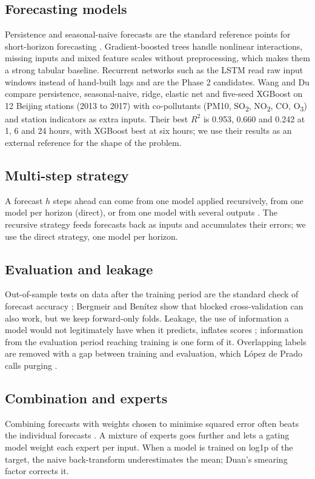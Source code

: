 \documentclass[conference]{IEEEtran}
\begin{document}
\subsection{Forecasting models}
Persistence and seasonal-naive forecasts are the standard reference points for short-horizon forecasting \cite{hyndman2021}. Gradient-boosted trees \cite{chen2016} handle nonlinear interactions, missing inputs and mixed feature scales without preprocessing, which makes them a strong tabular baseline. Recurrent networks such as the LSTM \cite{hochreiter1997} read raw input windows instead of hand-built lags and are the Phase 2 candidates. Wang and Du \cite{wang2026} compare persistence, seasonal-naive, ridge, elastic net and five-seed XGBoost on 12 Beijing stations (2013 to 2017) with co-pollutants (PM10, SO\textsubscript{2}, NO\textsubscript{2}, CO, O\textsubscript{3}) and station indicators as extra inputs. Their best $R^2$ is 0.953, 0.660 and 0.242 at 1, 6 and 24 hours, with XGBoost best at six hours; we use their results as an external reference for the shape of the problem.

\subsection{Multi-step strategy}
A forecast $h$ steps ahead can come from one model applied recursively, from one model per horizon (direct), or from one model with several outputs \cite{bentaieb2012}. The recursive strategy feeds forecasts back as inputs and accumulates their errors; we use the direct strategy, one model per horizon.

\subsection{Evaluation and leakage}
Out-of-sample tests on data after the training period are the standard check of forecast accuracy \cite{tashman2000}; Bergmeir and Ben\'{i}tez \cite{bergmeir2012} show that blocked cross-validation can also work, but we keep forward-only folds. Leakage, the use of information a model would not legitimately have when it predicts, inflates scores \cite{kaufman2012}; information from the evaluation period reaching training is one form of it. Overlapping labels are removed with a gap between training and evaluation, which L\'{o}pez de Prado calls purging \cite{lopezdeprado2018}.

\subsection{Combination and experts}
Combining forecasts with weights chosen to minimise squared error often beats the individual forecasts \cite{bates1969}. A mixture of experts \cite{jacobs1991} goes further and lets a gating model weight each expert per input. When a model is trained on log1p of the target, the naive back-transform underestimates the mean; Duan's smearing factor \cite{duan1983} corrects it.
\end{document}
